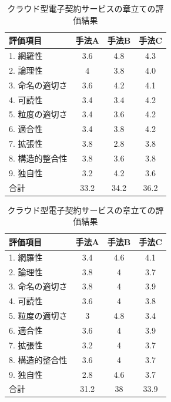 \begin{table}[tp]
  \centering
  \begin{minipage}{0.48\textwidth}
    \caption{BMP画像分割アプリの章立ての評価結果}
    \label{tb:bmp}
    \centering
    \begin{tabular}{|l|c|c|c|}
    \hline
    \textbf{評価項目} & \textbf{手法A} & \textbf{手法B} & \textbf{手法C} \\
    \hline\hline
    1. 網羅性 & 3.6 & 4.8 & 4.3 \\
    \hline
    2. 論理性 & 4 & 3.8 & 4.0 \\
    \hline
    3. 命名の適切さ & 3.6 & 4.2 & 4.1 \\
    \hline
    4. 可読性 & 3.4 & 3.4 & 4.2 \\
    \hline
    5. 粒度の適切さ & 3.4 & 3.6 & 4.2 \\
    \hline
    6. 適合性 & 3.4 & 3.8 & 4.2 \\
    \hline
    7. 拡張性 & 3.8 & 2.8 & 3.8 \\
    \hline
    8. 構造的整合性 & 3.8 & 3.6 & 3.8 \\
    \hline
    9. 独自性 & 3.2 & 4.2 & 3.6 \\
    \hline
    合計 & 33.2 & 34.2 & 36.2 \\
    \hline
    \end{tabular}
  \end{minipage}
  \hfill
  \begin{minipage}{0.48\textwidth}
    \caption{クラウド型電子契約サービスの章立ての評価結果}
    \label{tb:cloud}
    \centering
    \begin{tabular}{|l|c|c|c|}
    \hline
    \textbf{評価項目} & \textbf{手法A} & \textbf{手法B} & \textbf{手法C} \\
    \hline\hline
    1. 網羅性 & 3.4 & 4.6 & 4.1 \\
    \hline
    2. 論理性 & 3.8 & 4 & 3.7 \\
    \hline
    3. 命名の適切さ & 3.8 & 4 & 3.9 \\
    \hline
    4. 可読性 & 3.6 & 4 & 3.8 \\
    \hline
    5. 粒度の適切さ & 3 & 4.8 & 3.4 \\
    \hline
    6. 適合性 & 3.6 & 4 & 3.9 \\
    \hline
    7. 拡張性 & 3.2 & 4 & 3.7 \\
    \hline
    8. 構造的整合性 & 3.6 & 4 & 3.7 \\
    \hline
    9. 独自性 & 2.8 & 4.6 & 3.7 \\
    \hline
    合計 & 31.2 & 38 & 33.9 \\
    \hline
    \end{tabular}
  \end{minipage}
\end{table}



